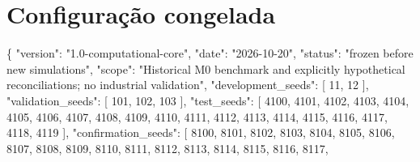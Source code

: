 \documentclass[
  11pt,
]{article}
\newenvironment{Shaded}{}{}
\newcommand{\DataTypeTok}[1]{\textcolor[rgb]{0.56,0.13,0.00}{#1}}
\newcommand{\DecValTok}[1]{\textcolor[rgb]{0.25,0.63,0.44}{#1}}
\newcommand{\FunctionTok}[1]{\textcolor[rgb]{0.02,0.16,0.49}{#1}}
\newcommand{\OtherTok}[1]{\textcolor[rgb]{0.00,0.44,0.13}{#1}}
\newcommand{\StringTok}[1]{\textcolor[rgb]{0.25,0.44,0.63}{#1}}
\begin{document}
\hypertarget{configurauxe7uxe3o-congelada}{%
\section{Configuração congelada}\label{configurauxe7uxe3o-congelada}}

\begin{Shaded}
\begin{Highlighting}[]
\FunctionTok{\{}
  \DataTypeTok{"version"}\FunctionTok{:} \StringTok{"1.0{-}computational{-}core"}\FunctionTok{,}
  \DataTypeTok{"date"}\FunctionTok{:} \StringTok{"2026{-}10{-}20"}\FunctionTok{,}
  \DataTypeTok{"status"}\FunctionTok{:} \StringTok{"frozen before new simulations"}\FunctionTok{,}
  \DataTypeTok{"scope"}\FunctionTok{:} \StringTok{"Historical M0 benchmark and explicitly hypothetical reconciliations; no industrial validation"}\FunctionTok{,}
  \DataTypeTok{"development\_seeds"}\FunctionTok{:} \OtherTok{[}
    \DecValTok{11}\OtherTok{,}
    \DecValTok{12}
  \OtherTok{]}\FunctionTok{,}
  \DataTypeTok{"validation\_seeds"}\FunctionTok{:} \OtherTok{[}
    \DecValTok{101}\OtherTok{,}
    \DecValTok{102}\OtherTok{,}
    \DecValTok{103}
  \OtherTok{]}\FunctionTok{,}
  \DataTypeTok{"test\_seeds"}\FunctionTok{:} \OtherTok{[}
    \DecValTok{4100}\OtherTok{,}
    \DecValTok{4101}\OtherTok{,}
    \DecValTok{4102}\OtherTok{,}
    \DecValTok{4103}\OtherTok{,}
    \DecValTok{4104}\OtherTok{,}
    \DecValTok{4105}\OtherTok{,}
    \DecValTok{4106}\OtherTok{,}
    \DecValTok{4107}\OtherTok{,}
    \DecValTok{4108}\OtherTok{,}
    \DecValTok{4109}\OtherTok{,}
    \DecValTok{4110}\OtherTok{,}
    \DecValTok{4111}\OtherTok{,}
    \DecValTok{4112}\OtherTok{,}
    \DecValTok{4113}\OtherTok{,}
    \DecValTok{4114}\OtherTok{,}
    \DecValTok{4115}\OtherTok{,}
    \DecValTok{4116}\OtherTok{,}
    \DecValTok{4117}\OtherTok{,}
    \DecValTok{4118}\OtherTok{,}
    \DecValTok{4119}
  \OtherTok{]}\FunctionTok{,}
  \DataTypeTok{"confirmation\_seeds"}\FunctionTok{:} \OtherTok{[}
    \DecValTok{8100}\OtherTok{,}
    \DecValTok{8101}\OtherTok{,}
    \DecValTok{8102}\OtherTok{,}
    \DecValTok{8103}\OtherTok{,}
    \DecValTok{8104}\OtherTok{,}
    \DecValTok{8105}\OtherTok{,}
    \DecValTok{8106}\OtherTok{,}
    \DecValTok{8107}\OtherTok{,}
    \DecValTok{8108}\OtherTok{,}
    \DecValTok{8109}\OtherTok{,}
    \DecValTok{8110}\OtherTok{,}
    \DecValTok{8111}\OtherTok{,}
    \DecValTok{8112}\OtherTok{,}
    \DecValTok{8113}\OtherTok{,}
    \DecValTok{8114}\OtherTok{,}
    \DecValTok{8115}\OtherTok{,}
    \DecValTok{8116}\OtherTok{,}
    \DecValTok{8117}\OtherTok{,}

\end{Highlighting}
\end{Shaded}
\end{document}
